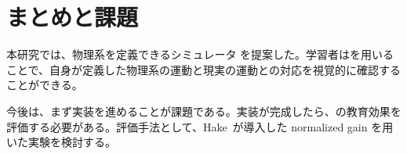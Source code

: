 \chapter{まとめと課題} \label{conclusion}

本研究では、物理系を定義できるシミュレータ \simname を提案した。学習者は\simname を用いることで、自身が定義した物理系の運動と現実の運動との対応を視覚的に確認することができる。

今後は、まず実装を進めることが課題である。実装が完成したら、\simname の教育効果を評価する必要がある。評価手法として、Hake~\cite{hake_1998}が導入した normalized gain を用いた実験を検討する。
